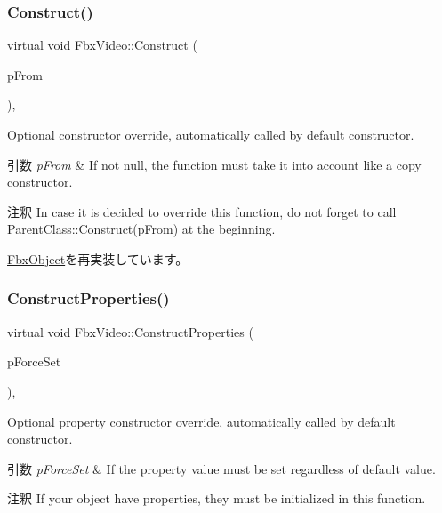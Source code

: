\subsubsection{\texorpdfstring{Construct()}{Construct()}}
{\footnotesize\ttfamily virtual void Fbx\+Video\+::\+Construct (\begin{DoxyParamCaption}\item[{const \hyperlink{class_fbx_object}{Fbx\+Object} $\ast$}]{p\+From }\end{DoxyParamCaption})\hspace{0.3cm}{\ttfamily [protected]}, {\ttfamily [virtual]}}

Optional constructor override, automatically called by default constructor. 
\begin{DoxyParams}{引数}
{\em p\+From} & If not null, the function must take it into account like a copy constructor. \\
\hline
\end{DoxyParams}
\begin{DoxyRemark}{注釈}
In case it is decided to override this function, do not forget to call Parent\+Class\+::\+Construct(p\+From) at the beginning. 
\end{DoxyRemark}


\hyperlink{class_fbx_object_a313503bc645af3fdceb4a99ef5cea7eb}{Fbx\+Object}を再実装しています。

\mbox{\label{class_fbx_video_a25c6015f2330ec4ff029ac919b1a231c}} 
\subsubsection{\texorpdfstring{Construct\+Properties()}{ConstructProperties()}}
{\footnotesize\ttfamily virtual void Fbx\+Video\+::\+Construct\+Properties (\begin{DoxyParamCaption}\item[{bool}]{p\+Force\+Set }\end{DoxyParamCaption})\hspace{0.3cm}{\ttfamily [protected]}, {\ttfamily [virtual]}}

Optional property constructor override, automatically called by default constructor. 
\begin{DoxyParams}{引数}
{\em p\+Force\+Set} & If the property value must be set regardless of default value. \\
\hline
\end{DoxyParams}
\begin{DoxyRemark}{注釈}
If your object have properties, they must be initialized in this function. 
\end{DoxyRemark}


